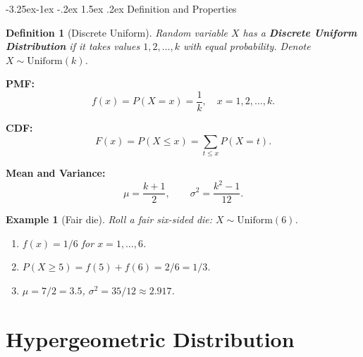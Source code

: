\documentclass{article}
\makeatletter
\newtheorem{definition}[theorem]{Definition}
\newtheorem{example}{Example}[section]
\theoremstyle{remark}
\newlength{\subsecindent}
\renewcommand\subsection{\@startsection{subsection}{2}{\subsecindent}%
  {-3.25ex\@plus -1ex \@minus -.2ex}%
  {1.5ex \@plus .2ex}%
  {\normalfont\large\bfseries}}
\newenvironment{sub}{%
  \begin{list}{}{%
    \setlength{\leftmargin}{4em}%
    \setlength{\rightmargin}{0pt}%
    \setlength{\topsep}{0pt}%
    \setlength{\partopsep}{0pt}%
    \setlength{\parsep}{\parskip}%
    \setlength{\itemsep}{\parskip}%
  }\item\relax
}{\end{list}}
\makeatother
\begin{document}
\subsection{Definition and Properties}
\begin{sub}

\begin{definition}[Discrete Uniform]
  Random variable $X$ has a \textbf{Discrete Uniform Distribution} if it
  takes values $1, 2, \ldots, k$ with equal probability.
  Denote $X \sim \text{Uniform}(k)$.
\end{definition}

\textbf{PMF:}
\begin{equation}
  f(x) = P(X = x) = \frac{1}{k}, \quad x = 1, 2, \ldots, k.
  \label{eq:uniform-pmf}
\end{equation}

\textbf{CDF:}
\[
  F(x) = P(X \le x) = \sum_{t \le x} P(X = t).
\]

\textbf{Mean and Variance:}
\begin{equation}
  \mu = \frac{k + 1}{2}, \qquad
  \sigma^2 = \frac{k^2 - 1}{12}.
  \label{eq:uniform-params}
\end{equation}

\begin{example}[Fair die]
  Roll a fair six-sided die: $X \sim \text{Uniform}(6)$.
  \begin{enumerate}
    \item[(a)] $f(x) = 1/6$ for $x = 1, \ldots, 6$.
    \item[(b)] $P(X \ge 5) = f(5) + f(6) = 2/6 = 1/3$.
    \item[(c)] $\mu = 7/2 = 3.5$, \; $\sigma^2 = 35/12 \approx 2.917$.
  \end{enumerate}
\end{example}

\end{sub}

\section{Hypergeometric Distribution}
\label{sec:det-hg}
\end{document}
